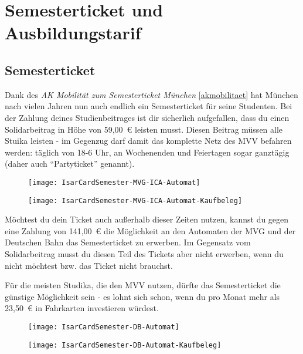 \chapter{Semesterticket und Ausbildungstarif}

\section{Semesterticket}
Dank des \emph{AK Mobilität zum Semesterticket München} \ref{akmobilitaet} hat München nach vielen Jahren nun auch endlich ein Semesterticket für seine Studenten. Bei der Zahlung deines Studienbeitrages ist dir sicherlich aufgefallen, dass du einen Solidarbeitrag in Höhe von 59,00~€ leisten musst. Diesen Beitrag müssen alle Stuika leisten - im Gegenzug darf damit das komplette Netz des MVV befahren werden: täglich von 18-6 Uhr, an Wochenenden und Feiertagen sogar ganztägig (daher auch "`Partyticket"' genannt).

\begin{figure}[ht]
\centering
\begin{minipage}[b]{0.45\linewidth}
\texttt{[image: IsarCardSemester-MVG-ICA-Automat]}
\end{minipage}
\quad
\begin{minipage}[b]{0.45\linewidth}
\texttt{[image: IsarCardSemester-MVG-ICA-Automat-Kaufbeleg]}
\end{minipage}
\end{figure}

Möchtest du dein Ticket auch außerhalb dieser Zeiten nutzen, kannst du gegen eine Zahlung von 141,00~€ die Möglichkeit an den Automaten der MVG und der Deutschen Bahn das Semesterticket zu erwerben. Im Gegensatz vom Solidarbeitrag musst du diesen Teil des Tickets aber nicht erwerben, wenn du nicht möchtest bzw. das Ticket nicht brauchst.

Für die meisten Studika, die den MVV nutzen, dürfte das Semesterticket die günstige Möglichkeit sein - es lohnt sich schon, wenn du pro Monat mehr als 23,50~€ in Fahrkarten investieren würdest.

\begin{figure}[ht]
\centering
\begin{minipage}[b]{0.45\linewidth}
\texttt{[image: IsarCardSemester-DB-Automat]}
\end{minipage}
\quad
\begin{minipage}[b]{0.45\linewidth}
\texttt{[image: IsarCardSemester-DB-Automat-Kaufbeleg]}
\end{minipage}
\end{figure}

